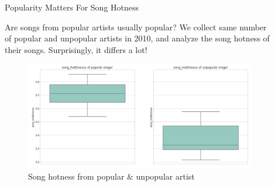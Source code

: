 \documentclass[final]{beamer}
\newlength{\sepwid}
\newlength{\onecolwid}
\newlength{\twocolwid}
\begin{document}
\begin{frame}
\begin{columns}[t]
\begin{column}{\twocolwid}
\begin{columns}[t,totalwidth=\twocolwid]
\begin{column}{\onecolwid}
\end{column} %
\begin{column}{\sepwid}\end{column} %

\begin{column}{\onecolwid}\vspace{-.74in} %


\begin{exampleblock}{Popularity Matters For Song Hotness}

Are songs from popular artists usually popular? We collect same number of popular and unpopular artists in 2010, and analyze the song hotness of their songs. Surprisingly, it differs a lot!

\begin{figure}
\includegraphics[width=1\linewidth]{img/Q2_2.PNG}
\caption{Song hotness from popular \& unpopular artist}
\end{figure}


\end{exampleblock}


\end{column} %

\end{columns} %



\end{column}
\end{columns}
\end{frame}
\end{document}
